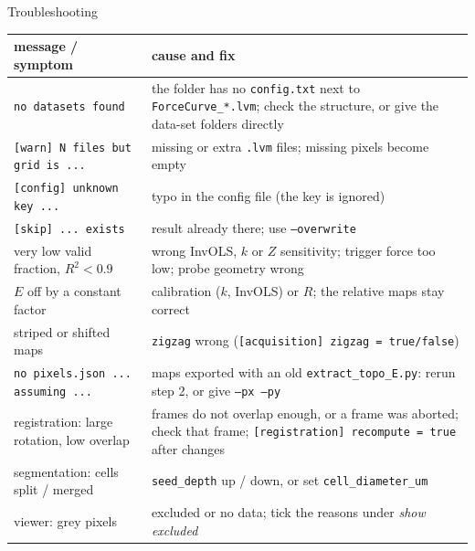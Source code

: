 \documentclass[aspectratio=169,9pt]{beamer}
\begin{document}
\begin{frame}{Troubleshooting}
\footnotesize
\begin{tabularx}{\textwidth}{@{}>{\raggedright\arraybackslash}p{} X@{}}
\toprule
message / symptom & cause and fix\\
\midrule
\texttt{no datasets found} & the folder has no \texttt{config.txt} next to \texttt{ForceCurve\_*.lvm}; check the structure, or give the data-set folders directly\\
\texttt{[warn] N files but grid is ...} & missing or extra \texttt{.lvm} files; missing pixels become empty\\
\texttt{[config] unknown key ...} & typo in the config file (the key is ignored)\\
\texttt{[skip] ... exists} & result already there; use \texttt{--overwrite}\\
very low valid fraction, $R^2<0.9$ & wrong InvOLS, $k$ or $Z$ sensitivity; trigger force too low; probe geometry wrong\\
$E$ off by a constant factor & calibration ($k$, InvOLS) or $R$; the relative maps stay correct\\
striped or shifted maps & \texttt{zigzag} wrong (\texttt{[acquisition] zigzag = true/false})\\
\texttt{no pixels.json ... assuming ...} & maps exported with an old \texttt{extract\_topo\_E.py}: rerun step 2, or give \texttt{--px --py}\\
registration: large rotation, low overlap & frames do not overlap enough, or a frame was aborted; check that frame; \texttt{[registration] recompute = true} after changes\\
segmentation: cells split / merged & \texttt{seed\_depth} up / down, or set \texttt{cell\_diameter\_um}\\
viewer: grey pixels & excluded or no data; tick the reasons under \emph{show excluded}\\
\bottomrule
\end{tabularx}
\end{frame}
\end{document}
